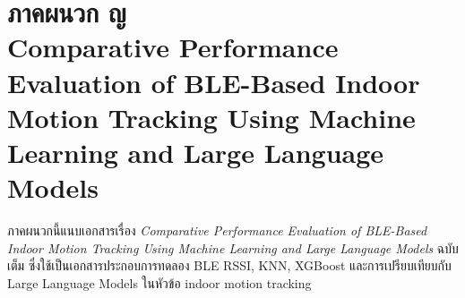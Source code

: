 \chapter[Comparative Performance Evaluation of BLE-Based Indoor Motion Tracking]{\texorpdfstring{ภาคผนวก ญ\\Comparative Performance Evaluation of BLE-Based Indoor Motion Tracking Using Machine Learning and Large Language Models}{Appendix J: Comparative Performance Evaluation of BLE-Based Indoor Motion Tracking Using Machine Learning and Large Language Models}}
\label{app:paperieee_extract}

ภาคผนวกนี้แนบเอกสารเรื่อง \textit{Comparative Performance Evaluation of BLE-Based Indoor Motion Tracking Using Machine Learning and Large Language Models} ฉบับเต็ม ซึ่งใช้เป็นเอกสารประกอบการทดลอง BLE RSSI, KNN, XGBoost และการเปรียบเทียบกับ Large Language Models ในหัวข้อ indoor motion tracking


